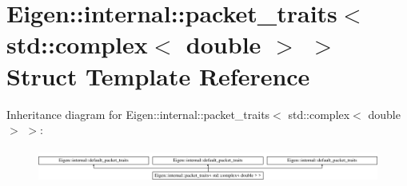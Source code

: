 \hypertarget{struct_eigen_1_1internal_1_1packet__traits_3_01std_1_1complex_3_01double_01_4_01_4}{}\section{Eigen\+::internal\+::packet\+\_\+traits$<$ std\+::complex$<$ double $>$ $>$ Struct Template Reference}
\label{struct_eigen_1_1internal_1_1packet__traits_3_01std_1_1complex_3_01double_01_4_01_4}
Inheritance diagram for Eigen\+::internal\+::packet\+\_\+traits$<$ std\+::complex$<$ double $>$ $>$\+:\begin{figure}[H]
\begin{center}
\leavevmode
\includegraphics[height=1.127895cm]{struct_eigen_1_1internal_1_1packet__traits_3_01std_1_1complex_3_01double_01_4_01_4}
\end{center}
\end{figure}
